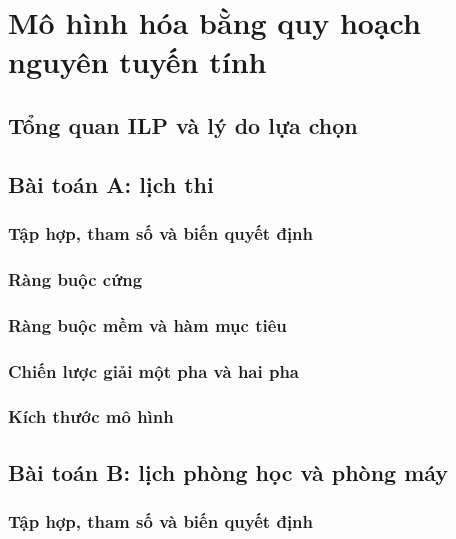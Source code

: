 
\chapter{Mô hình hóa bằng quy hoạch nguyên tuyến tính}
\label{ch:mo-hinh}

\section{Tổng quan ILP và lý do lựa chọn}
\label{sec:ilp}

\section{Bài toán A: lịch thi}
\label{sec:mo-hinh-a}

\subsection{Tập hợp, tham số và biến quyết định}
\label{subsec:a-bien}

\subsection{Ràng buộc cứng}
\label{subsec:a-cung}

\subsection{Ràng buộc mềm và hàm mục tiêu}
\label{subsec:a-mem}

\subsection{Chiến lược giải một pha và hai pha}
\label{subsec:a-chien-luoc}

\subsection{Kích thước mô hình}
\label{subsec:a-kich-thuoc}

\section{Bài toán B: lịch phòng học và phòng máy}
\label{sec:mo-hinh-b}

\subsection{Tập hợp, tham số và biến quyết định}
\label{subsec:b-bien}


